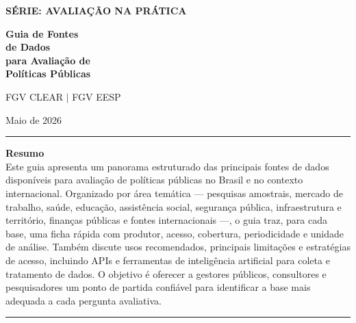 
\thispagestyle{empty}
\begin{center}
\vspace*{3cm}

{\Large\bfseries\color{clearlightblue} SÉRIE: AVALIAÇÃO NA PRÁTICA}

\vspace{1.5cm}

{\Huge\bfseries\color{clearblue}
  Guia de Fontes\\[0.3cm]
  de Dados\\[0.3cm]
  para Avaliação de\\[0.3cm]
  Políticas Públicas}

\vspace{2cm}

{\large FGV CLEAR $|$ FGV EESP}

\vspace{0.5cm}
{\large Maio de 2026}

\vfill

\vspace{0.5cm}
\noindent\textcolor{clearlightblue}{\rule{\textwidth}{0.6pt}}
\vspace{0.3cm}

\begin{minipage}{0.92\textwidth}
\centering
\vspace*{4em}
{\small\textbf{Resumo}}\\[0.4em]
\small\setlength{\parindent}{0pt}
Este guia apresenta um panorama estruturado das principais fontes de dados
disponíveis para avaliação de políticas públicas no Brasil e no contexto
internacional. Organizado por área temática --- pesquisas amostrais, mercado
de trabalho, saúde, educação, assistência social, segurança pública,
infraestrutura e território, finanças públicas e fontes internacionais ---,
o guia traz, para cada base, uma ficha rápida com produtor, acesso,
cobertura, periodicidade e unidade de análise. Também discute usos
recomendados, principais limitações e estratégias de acesso, incluindo APIs
e ferramentas de inteligência artificial para coleta e tratamento de dados.
O objetivo é oferecer a gestores públicos, consultores e pesquisadores um
ponto de partida confiável para identificar a base mais adequada a cada
pergunta avaliativa.
\end{minipage}

\vspace{0.3cm}
\noindent\textcolor{clearlightblue}{\rule{\textwidth}{0.6pt}}
\end{center}
\newpage